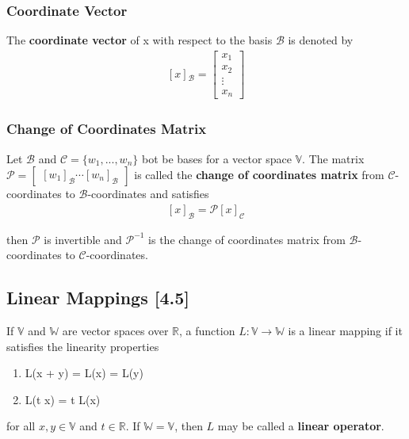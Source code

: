 \documentclass[a4paper,9pt]{extarticle}
\begin{document}
\begin{multicols*}{2}
\subsubsection{Coordinate Vector}
The \textbf{coordinate vector} of x with respect to the basis $\mathcal{B}$ is denoted by
\begin{equation} \label{4.3-2}
    \begin{split}
        [x]{_\mathcal{B}} = \begin{bmatrix}x_1 \\ x_2 \\ \vdots \\ x_n \end{bmatrix}
    \end{split}
\end{equation}


\subsubsection{Change of Coordinates Matrix}
Let $\mathcal{B}$ and $\mathcal{C} = \{w_1, ..., w_n\}$ bot be bases for a vector space $\mathbb{V}$. The matrix $\mathcal{P} = \begin{bmatrix}[w_1]_{\mathcal{B}} \cdots  [w_n]_{\mathcal{B}}\end{bmatrix}$ is called the \textbf{change of coordinates matrix} from $\mathcal{C}$-coordinates to $\mathcal{B}$-coordinates and satisfies 
\begin{equation} \label{4.3-3}
    \begin{split}
        [x]_{\mathcal{B}} = \mathcal{P} [x]_{\mathcal{C}}
    \end{split}
\end{equation}

\noindent then $\mathcal{P}$ is invertible and $\mathcal{P}^{-1}$ is the change of coordinates matrix from $\mathcal{B}$-coordinates to $\mathcal{C}$-coordinates.


\subsection{Linear Mappings [4.5]}
If $\mathbb{V}$ and $\mathbb{W}$ are vector spaces over $\mathbb{R}$, a function $L : \mathbb{V} \to \mathbb{W}$ is a linear mapping if it satisfies the linearity properties
\begin{enumerate}[label=\bfseries L\arabic*] \itemsep0pt \parskip0pt 
    \item L(x + y) = L(x) = L(y)
    \item L(t x) = t L(x)
\end{enumerate}
for all $x, y \in \mathbb{V}$ and $t \in \mathbb{R}$. If $\mathbb{W} = \mathbb{V}$, then $L$ may be called a \textbf{linear operator}. 



\end{multicols*}
\end{document}
